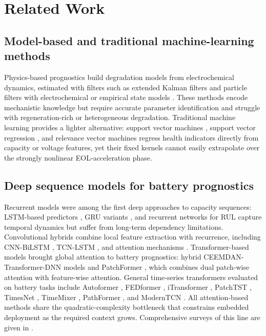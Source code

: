 \section{Related Work}
\label{sec:related}

\subsection{Model-based and traditional machine-learning methods}

Physics-based prognostics build degradation models from electrochemical
dynamics, estimated with filters such as extended Kalman filters
\cite{ref_ekf_yan} and particle filters with electrochemical or empirical state models
\cite{ref_pf_echem,ref_pf_rbf,ref_pf_lui}. These methods encode
mechanistic knowledge but require accurate parameter identification
and struggle with regeneration-rich or heterogeneous degradation.
Traditional machine learning provides a lighter alternative:
support vector machines \cite{ref_svm_klass,ref_svm_patil}, support
vector regression \cite{ref_svr_wang}, and relevance vector machines
\cite{ref_rvm_guo} regress health indicators directly from capacity
or voltage features, yet their fixed kernels cannot easily extrapolate
over the strongly nonlinear EOL-acceleration phase.

\subsection{Deep sequence models for battery prognostics}

Recurrent models were among the first deep approaches to capacity sequences:
LSTM-based predictors \cite{ref_lstm_rul_zhang,ref_lstm_elman_li},
GRU variants \cite{ref_gru_rnn}, and recurrent networks
for RUL \cite{ref_rnn_catelani} capture temporal dynamics but suffer
from long-term dependency limitations. Convolutional hybrids combine
local feature extraction with recurrence, including CNN-BiLSTM
\cite{ref_cnn_bilstm}, TCN-LSTM \cite{ref_tcn_lstm}, and attention
mechanisms \cite{ref_lstm_transformer}. Transformer-based models
\cite{ref_vaswani} brought global attention to battery prognostics:
hybrid CEEMDAN-Transformer-DNN models \cite{ref_ceemdan_trans} and
PatchFormer \cite{ref_patchformer}, which combines dual patch-wise
attention with feature-wise attention. General time-series
transformers evaluated on battery tasks include Autoformer
\cite{ref_autoformer}, FEDformer \cite{ref_fedformer}, iTransformer
\cite{ref_itransformer}, PatchTST \cite{ref_patchtst}, TimesNet
\cite{ref_timesnet}, TimeMixer \cite{ref_timemixer}, PathFormer
\cite{ref_pathformer}, and ModernTCN \cite{ref_moderntcn}. All
attention-based methods share the quadratic-complexity bottleneck
that constrains embedded deployment as the required context grows.
Comprehensive surveys of this
line are given in \cite{ref_lipu_review,ref_he_review}.

